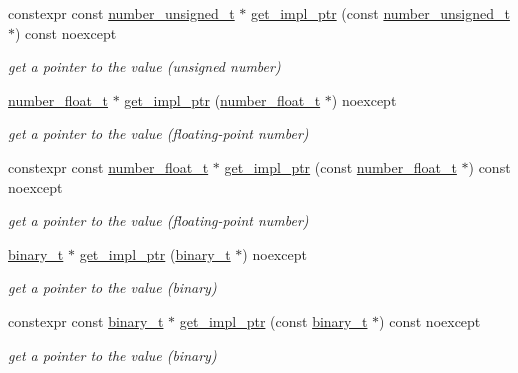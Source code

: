 \begin{DoxyCompactItemize}
constexpr const \hyperlink{classnlohmann_1_1basic__json_ae09af9c23351b7245d9be4d1b2035fef}{number\+\_\+unsigned\+\_\+t} $\ast$ \hyperlink{classnlohmann_1_1basic__json_a5cf0d01a7b245c82263cc73bfb070c3f}{get\+\_\+impl\+\_\+ptr} (const \hyperlink{classnlohmann_1_1basic__json_ae09af9c23351b7245d9be4d1b2035fef}{number\+\_\+unsigned\+\_\+t} $\ast$) const noexcept
\begin{DoxyCompactList}\small\item\em get a pointer to the value (unsigned number) \end{DoxyCompactList}\item 
\hyperlink{classnlohmann_1_1basic__json_a5b8abaebd922d82d69756327c0c347e6}{number\+\_\+float\+\_\+t} $\ast$ \hyperlink{classnlohmann_1_1basic__json_a3f8e91583b4d0f16eed6c690f1022a02}{get\+\_\+impl\+\_\+ptr} (\hyperlink{classnlohmann_1_1basic__json_a5b8abaebd922d82d69756327c0c347e6}{number\+\_\+float\+\_\+t} $\ast$) noexcept
\begin{DoxyCompactList}\small\item\em get a pointer to the value (floating-\/point number) \end{DoxyCompactList}\item 
constexpr const \hyperlink{classnlohmann_1_1basic__json_a5b8abaebd922d82d69756327c0c347e6}{number\+\_\+float\+\_\+t} $\ast$ \hyperlink{classnlohmann_1_1basic__json_a9ad84afed3e707cd066380b12901f9db}{get\+\_\+impl\+\_\+ptr} (const \hyperlink{classnlohmann_1_1basic__json_a5b8abaebd922d82d69756327c0c347e6}{number\+\_\+float\+\_\+t} $\ast$) const noexcept
\begin{DoxyCompactList}\small\item\em get a pointer to the value (floating-\/point number) \end{DoxyCompactList}\item 
\hyperlink{classnlohmann_1_1basic__json_ad6c955145bebde84d93991ffed7cd389}{binary\+\_\+t} $\ast$ \hyperlink{classnlohmann_1_1basic__json_a5b429e4041392a984ce5b6f85196b570}{get\+\_\+impl\+\_\+ptr} (\hyperlink{classnlohmann_1_1basic__json_ad6c955145bebde84d93991ffed7cd389}{binary\+\_\+t} $\ast$) noexcept
\begin{DoxyCompactList}\small\item\em get a pointer to the value (binary) \end{DoxyCompactList}\item 
constexpr const \hyperlink{classnlohmann_1_1basic__json_ad6c955145bebde84d93991ffed7cd389}{binary\+\_\+t} $\ast$ \hyperlink{classnlohmann_1_1basic__json_a38632b8b0c8c7bf4b54bd6fe782c0196}{get\+\_\+impl\+\_\+ptr} (const \hyperlink{classnlohmann_1_1basic__json_ad6c955145bebde84d93991ffed7cd389}{binary\+\_\+t} $\ast$) const noexcept
\begin{DoxyCompactList}\small\item\em get a pointer to the value (binary) \end{DoxyCompactList}\end{DoxyCompactItemize}

